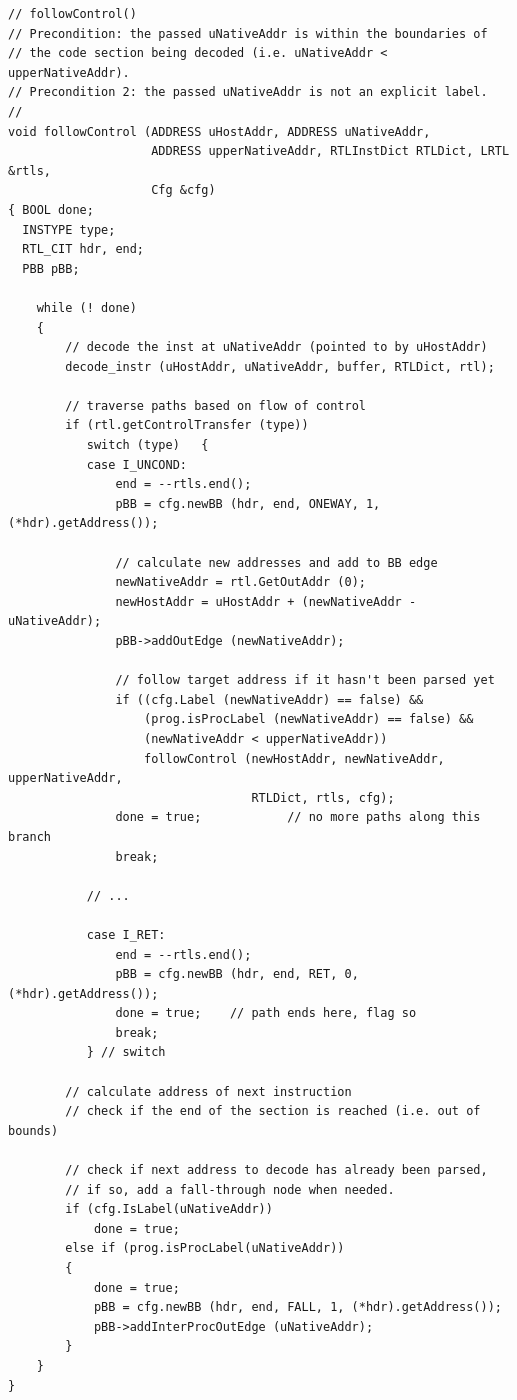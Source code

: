 {\small
\begin{verbatim}
// followControl()
// Precondition: the passed uNativeAddr is within the boundaries of
// the code section being decoded (i.e. uNativeAddr < upperNativeAddr).
// Precondition 2: the passed uNativeAddr is not an explicit label.
//
void followControl (ADDRESS uHostAddr, ADDRESS uNativeAddr,
                    ADDRESS upperNativeAddr, RTLInstDict RTLDict, LRTL &rtls,
                    Cfg &cfg)
{ BOOL done;
  INSTYPE type;
  RTL_CIT hdr, end;
  PBB pBB;

    while (! done)
    {
        // decode the inst at uNativeAddr (pointed to by uHostAddr)
        decode_instr (uHostAddr, uNativeAddr, buffer, RTLDict, rtl);

        // traverse paths based on flow of control
        if (rtl.getControlTransfer (type))
           switch (type)   {
           case I_UNCOND:
               end = --rtls.end();
               pBB = cfg.newBB (hdr, end, ONEWAY, 1, (*hdr).getAddress());
 
               // calculate new addresses and add to BB edge
               newNativeAddr = rtl.GetOutAddr (0);
               newHostAddr = uHostAddr + (newNativeAddr - uNativeAddr);
               pBB->addOutEdge (newNativeAddr);
 
               // follow target address if it hasn't been parsed yet
               if ((cfg.Label (newNativeAddr) == false) &&
                   (prog.isProcLabel (newNativeAddr) == false) &&
                   (newNativeAddr < upperNativeAddr))
                   followControl (newHostAddr, newNativeAddr, upperNativeAddr, 
                                  RTLDict, rtls, cfg);
               done = true;            // no more paths along this branch
               break;

           // ...

           case I_RET:
               end = --rtls.end();
               pBB = cfg.newBB (hdr, end, RET, 0, (*hdr).getAddress());
               done = true;    // path ends here, flag so
               break;
           } // switch

        // calculate address of next instruction
        // check if the end of the section is reached (i.e. out of bounds)
 
        // check if next address to decode has already been parsed,
        // if so, add a fall-through node when needed.
        if (cfg.IsLabel(uNativeAddr))
            done = true;
        else if (prog.isProcLabel(uNativeAddr))
        {
            done = true;
            pBB = cfg.newBB (hdr, end, FALL, 1, (*hdr).getAddress());
            pBB->addInterProcOutEdge (uNativeAddr);
        }
    } 
} 
\end{verbatim}
}

